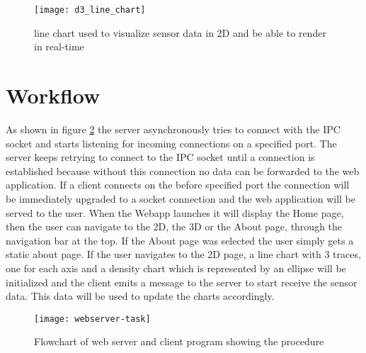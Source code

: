 \begin{figure}[H]
    \centering
    \texttt{[image: d3\_line\_chart]}
    \caption{line chart used to visualize sensor data in 2D and be able to render in real-time}
    \label{fig:d3linechart}
\end{figure}


\section{Workflow}

As shown in figure \ref{fig:webserver-program-flow} the server asynchronously tries to connect with the IPC socket and starts listening for incoming connections on a specified port. The server keeps retrying to connect to the IPC socket until a connection is established because without this connection no data can be forwarded to the web application. If a client connects on the before specified port the connection will be immediately upgraded to a socket connection and the web application will be served to the user. When the Webapp launches it will display the Home page, then the user can navigate to the 2D, the 3D or the About page, through the navigation bar at the top. If the About page was selected the user simply gets a static about page. If the user navigates to the 2D page, a line chart with 3 traces, one for each axis and a density chart which is represented by an ellipse will be initialized and the client emits a message to the server to start receive the sensor data. This data will be used to update the charts accordingly.

\begin{figure}[H]
    \centering
    \texttt{[image: webserver-task]}
    \caption{Flowchart of web server and client program showing the procedure}
    \label{fig:webserver-program-flow}
\end{figure}
